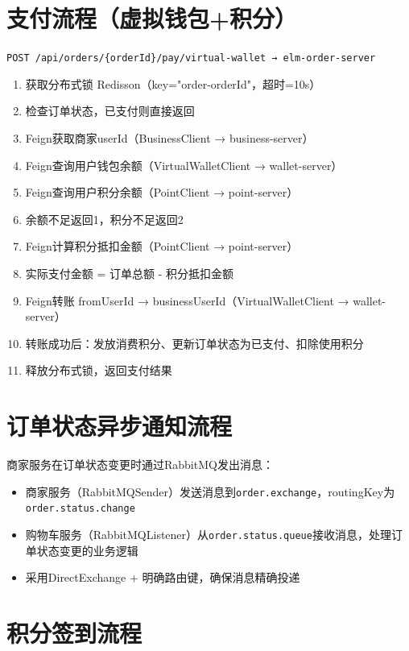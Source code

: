 \section{支付流程（虚拟钱包+积分）}

\verb|POST /api/orders/{orderId}/pay/virtual-wallet → elm-order-server|

\begin{enumerate}
	\item 获取分布式锁 Redisson（key="order-{orderId}"，超时=10s）
	\item 检查订单状态，已支付则直接返回
	\item Feign获取商家userId（BusinessClient → business-server）
	\item Feign查询用户钱包余额（VirtualWalletClient → wallet-server）
	\item Feign查询用户积分余额（PointClient → point-server）
	\item 余额不足返回1，积分不足返回2
	\item Feign计算积分抵扣金额（PointClient → point-server）
	\item 实际支付金额 = 订单总额 - 积分抵扣金额
	\item Feign转账 fromUserId → businessUserId（VirtualWalletClient → wallet-server）
	\item 转账成功后：发放消费积分、更新订单状态为已支付、扣除使用积分
	\item 释放分布式锁，返回支付结果
\end{enumerate}

\section{订单状态异步通知流程}

商家服务在订单状态变更时通过RabbitMQ发出消息：

\begin{itemize}
	\item 商家服务（RabbitMQSender）发送消息到\verb|order.exchange|，routingKey为\verb|order.status.change|
	\item 购物车服务（RabbitMQListener）从\verb|order.status.queue|接收消息，处理订单状态变更的业务逻辑
	\item 采用DirectExchange + 明确路由键，确保消息精确投递
\end{itemize}

\section{积分签到流程}

